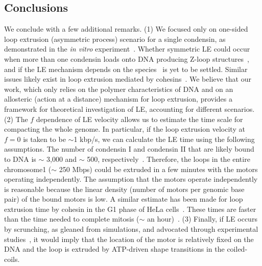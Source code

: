 \documentclass[fleqn,10pt]{wlscirep}
\begin{document}
\subsection*{Conclusions}
We conclude with a few additional remarks. 
(1) We focused only on one-sided loop extrusion (asymmetric process)  scenario for a single condensin, as demonstrated in the {\it in vitro} experiment~\cite{ganji2018real}.  Whether symmetric LE could occur when more than one condensin loads onto DNA producing Z-loop structures~\cite{kim2020dna}, and if the LE mechanism depends on the species~\cite{kong2020human} is yet to be settled. Similar issues likely exist in loop extrusion mediated by cohesins~\cite{kim2019human,davidson2019dna}. We believe that our work, which only relies on the polymer characteristics of DNA and on an allosteric (action at a distance) mechanism for loop extrusion,  provides a framework for theoretical investigation of LE, accounting for different scenarios. (2) The $f$ dependence of  LE velocity allows us to estimate the time scale for compacting the whole genome.  In particular, if the loop extrusion velocity at $f=0$ is taken to be $\sim$1 kbp/s, we can calculate the LE  time using the following assumptions. The number of condensin I and condensin II that are likely bound to DNA is $\sim$ 3,000 and $\sim$ 500, respectively~\cite{walther2018quantitative}.  Therefore, the loops in the entire chromosome1 ($\sim$ 250 Mbps) could be extruded in a few minutes with the motors operating independently. The assumption that the motors operate independently is reasonable because the linear density (number of motors per genomic base pair) of the bound motors is low. A similar estimate has been made for loop extrusion time by cohesin in the G1 phase of HeLa cells~\cite{davidson2019dna}. These times are faster than the time needed to complete mitosis ($\sim$ an hour)~\cite{gibcus2018pathway}. %
(3) Finally, if LE occurs by scrunching, as gleaned from simulations, and advocated through experimental studies~\cite{ryu2020condensin}, it would imply that the location of the motor is relatively fixed on the DNA and the loop is extruded by ATP-driven shape transitions in the coiled-coils.




\end{document}
